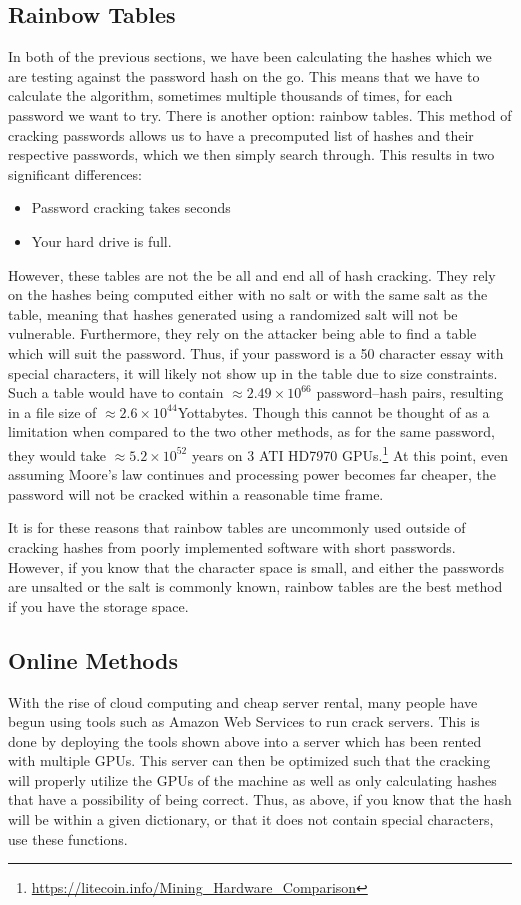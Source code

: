 		\subsection{Rainbow Tables}
			In both of the previous sections, we have been calculating the hashes which we are testing against the password hash on the go. 
			This means that we have to calculate the algorithm, sometimes multiple thousands of times, for each password we want to try. 
			There is another option: rainbow tables. 
			This method of cracking passwords allows us to have a precomputed list of hashes and their respective passwords, which we then simply search through. 
			This results in two significant differences:
			\begin{itemize}
				\item Password cracking takes seconds
				\item Your hard drive is full. 
			\end{itemize}
			However, these tables are not the be all and end all of hash cracking. 
			They rely on the hashes being computed either with no salt or with the same salt as the table, meaning that hashes generated using a randomized salt will not be vulnerable. 
			Furthermore, they rely on the attacker being able to find a table which will suit the password. 
			Thus, if your password is a 50 character essay with special characters, it will likely not show up in the table due to size constraints. 
			Such a table would have to contain $\approx2.49\times10^{66}$ password--hash pairs, resulting in a file size of $\approx2.6\times10^{44}$Yottabytes.
			Though this cannot be thought of as a limitation when compared to the two other methods, as for the same password, they would take $\approx5.2\times10^{52}$ years on 3 ATI HD7970 GPUs.\footnote{\url{https://litecoin.info/Mining\_Hardware\_Comparison}}
			At this point, even assuming Moore's law continues and processing power becomes far cheaper, the password will not be cracked within a reasonable time frame. 

			It is for these reasons that rainbow tables are uncommonly used outside of cracking hashes from poorly implemented software with short passwords. 
			However, if you know that the character space is small, and either the passwords are unsalted or the salt is commonly known, rainbow tables are the best method if you have the storage space. 
		\subsection{Online Methods}
			With the rise of cloud computing and cheap server rental, many people have begun using tools such as Amazon Web Services to run crack servers. 
			This is done by deploying the tools shown above into a server which has been rented with multiple GPUs. 
			This server can then be optimized such that the cracking will properly utilize the GPUs of the machine as well as only calculating hashes that have a possibility of being correct. 
			Thus, as above, if you know that the hash will be within a given dictionary, or that it does not contain special characters, use these functions. 

